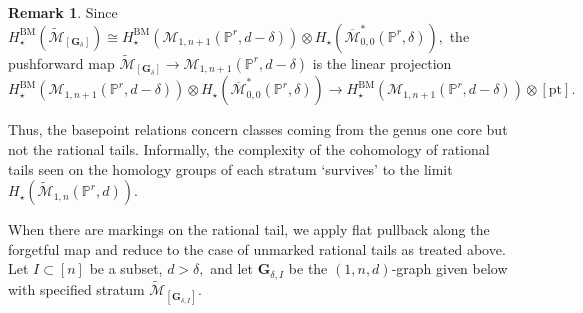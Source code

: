 \documentclass[12pt,reqno]{amsart}
\theoremstyle{definition}
\theoremstyle{definition}
\theoremstyle{definition}
\theoremstyle{definition}
\newtheorem{remark}[theorem]{Remark}
\newcommand{\ol}[1]{\overline{#1}}
\newcommand{\PP}{\mathbb{P}}
\newcommand{\Mcal}{\mathcal{M}}
\newcommand{\Mbar}{\ol{\Mcal}}
\newcommand{\Mtil}{\widetilde{\mathcal{M}}}
\begin{document}
\begin{remark}
  Since $H_{\star}^{\mathrm{BM}}(\Mtil_{[\mathbf{G}_{\delta}]})\cong H^{\mathrm{BM}}_{\star}(\mathcal{M}_{1,n+1}(\PP^r,d-\delta))\otimes H_\star(\Mbar_{0,0}^*(\PP^r,\delta)),$ the pushforward map $\Mtil_{[\mathbf{G}_{\delta}]}\to \mathcal{M}_{1,n+1}(\PP^r,d-\delta)$ is the linear projection 
  $$H^{\mathrm{BM}}_{\star}(\mathcal{M}_{1,n+1}(\PP^r,d-\delta))\otimes H_\star(\Mbar_{0,0}^*(\PP^r,\delta))\to H^{\mathrm{BM}}_{\star}(\mathcal{M}_{1,n+1}(\PP^r,d-\delta))\otimes [\mathrm{pt}].$$

  Thus, the basepoint relations concern classes coming from the genus one core but not the rational tails. Informally, the complexity of the cohomology of rational tails seen on the homology groups of each stratum `survives' to the limit $H_\star(\Mtil_{1,n}(\PP^r,d)).$
\end{remark}


When there are markings on the rational tail, we apply flat pullback along the forgetful map and reduce to the case of unmarked rational tails as treated above. Let $I\subset [n]$ be a subset, $d>\delta,$ and let $\mathbf{G}_{\delta, I}$ be the $(1,n,d)$-graph given below with specified stratum $\Mtil_{[\mathbf{G}_{\delta, I}]}.$
\end{document}
